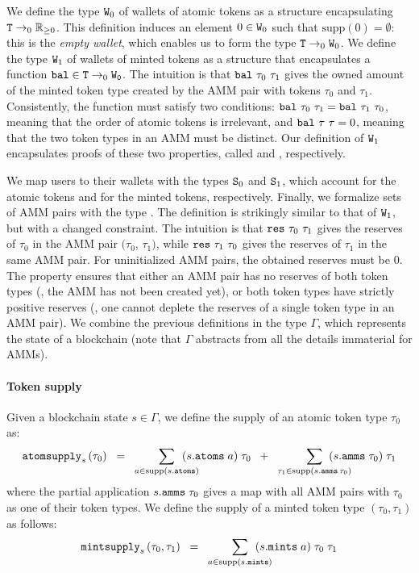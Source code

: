 We define the type $\code W_0$ of wallets of atomic tokens as a structure encapsulating $\code T \to_0 \mathbb R_{\geq 0}$. This definition induces an element $0 \in \code W_0$ such that $\mathrm{supp}\left(0\right) = \emptyset$: this is the \emph{empty wallet}, which enables us to form the type $\code T \to_0 \code W_0$. 
%
We define the type $\code W_1$ of wallets of minted tokens 
as a structure that encapsulates a function $\code{bal} \in \code T \to_0 \code{W_0}$. 
The intuition is that $\code{bal}\ \tau_0\ \tau_1$ gives the owned amount of the minted token type created by the AMM pair with tokens $\tau_0$ and $\tau_1$.
Consistently, the function  must satisfy two conditions: 
$\code{bal}\ \tau_0\ \tau_1 = \code{bal}\ \tau_1\ \tau_0$, 
meaning that the order of atomic tokens is irrelevant, 
and $\code{bal}\ \tau\ \tau = 0$, meaning that the two token types 
in an AMM must be distinct. 
Our definition of $\code W_1$ encapsulates proofs of these two properties, called  and , respectively.

We map users to their wallets with the types $\code S_0$ and $\code S_1$,
which account for the atomic tokens and for the minted tokens,
respectively.
Finally, we formalize sets of AMM pairs with the type . 
The definition is strikingly similar to that of $\code W_1$, but with a changed constraint. 
The intuition is that $\code{res}\ \tau_0\ \tau_1$ gives the reserves of $\tau_0$ in the AMM pair $(\tau_0$, $\tau_1)$,
while  $\code{res}\ \tau_1\ \tau_0$ gives the reserves of $\tau_1$ in the same AMM pair. 
For uninitialized AMM pairs, the obtained reserves must be $0$. 
The property  ensures that either an AMM pair has 
no reserves of both token types (\ie, the AMM has not been created yet),
or both token types have strictly positive reserves
(\ie, one cannot deplete the reserves of a single token type in an AMM pair).
% 
We combine the previous definitions in the type $\Gamma$, which represents the state of a blockchain (note that $\Gamma$ abstracts from all the details immaterial for AMMs). 

\paragraph*{Token supply}

Given a blockchain state $s \in \Gamma$, we define the supply of an atomic token type $\tau_0$ as:
\[
\code{atomsupply}_s\left(\tau_0\right) 
\;\; = \;\; 
\sum_{a \in \mathrm{supp}(s\code{.atoms})} 
\hspace{-15pt}
(s\code{.atoms} \; a) \; \tau_0 
\;\; + \;\;
\sum_{\tau_1 \in \mathrm{supp}(s\code{.amms} \, \tau_0)} 
\hspace{-20pt}
(s\code{.amms} \; \tau_0) \; \tau_1
\]
where the partial application $s\code{.amms} \; \tau_0$ 
gives a map with all AMM pairs with $\tau_0$ as one of their token types.
We define the supply of a minted token type $(\tau_0,\tau_1)$ as follows:
\[
\code{mintsupply}_s\left(\tau_0, \tau_1\right) 
\;\; = \;\; 
\sum_{a \in \mathrm{supp}(s\code{.mints})} 
\hspace{-15pt}
(s\code{.mints} \; a) \; \tau_0 \;\tau_1
\]

